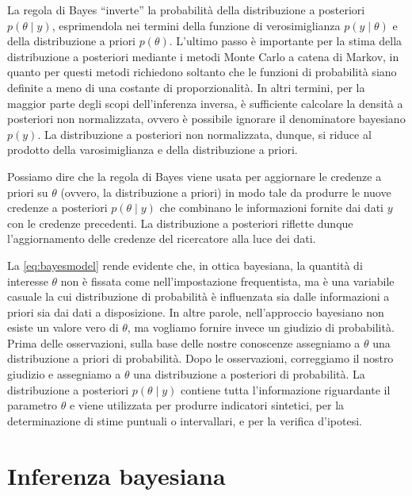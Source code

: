 \documentclass[
  11pt,
  italian,
  a4paper,
  extrafontsizes,onecolumn,openright
  ]{memoir}
\begin{document}
La regola di Bayes ``inverte'' la probabilità della distribuzione a posteriori \(p(\theta \mid y)\), esprimendola nei termini della funzione di verosimiglianza \(p(y \mid \theta)\) e della distribuzione a priori \(p(\theta)\). L'ultimo passo è importante per la stima della distribuzione a posteriori mediante i metodi Monte Carlo a catena di Markov, in quanto per questi metodi richiedono soltanto che le funzioni di probabilità siano definite a meno di una costante di proporzionalità. In altri termini, per la maggior parte degli scopi dell'inferenza inversa, è sufficiente calcolare la densità a posteriori non normalizzata, ovvero è possibile ignorare il denominatore bayesiano \(p(y)\). La distribuzione a posteriori non normalizzata, dunque, si riduce al prodotto della varosimiglianza e della distribuzione a priori.

Possiamo dire che la regola di Bayes viene usata per aggiornare le credenze a priori su \(\theta\) (ovvero, la distribuzione a priori) in modo tale da produrre le nuove credenze a posteriori \(p(\theta \mid y)\) che combinano le informazioni fornite dai dati \(y\) con le credenze precedenti. La distribuzione a posteriori riflette dunque l'aggiornamento delle credenze del ricercatore alla luce dei dati.

La \eqref{eq:bayesmodel} rende evidente che, in ottica bayesiana, la quantità di interesse \(\theta\) non è fissata come nell'impostazione frequentista, ma è una variabile casuale la cui distribuzione di probabilità è influenzata sia dalle informazioni a priori sia dai dati a disposizione. In altre parole, nell'approccio bayesiano non esiste un valore vero di \(\theta\), ma vogliamo fornire invece un giudizio di probabilità. Prima delle osservazioni, sulla base delle nostre conoscenze assegniamo a \(\theta\) una distribuzione a priori di probabilità. Dopo le osservazioni, correggiamo il nostro giudizio e assegniamo a \(\theta\) una distribuzione a posteriori di probabilità. La distribuzione a posteriori \(p(\theta \mid y)\) contiene tutta l'informazione riguardante il parametro \(\theta\) e viene utilizzata per produrre indicatori sintetici, per la determinazione di stime puntuali o intervallari, e per la verifica d'ipotesi.

\hypertarget{inferenza-bayesiana}{%
\section{Inferenza bayesiana}\label{inferenza-bayesiana}}
\end{document}
